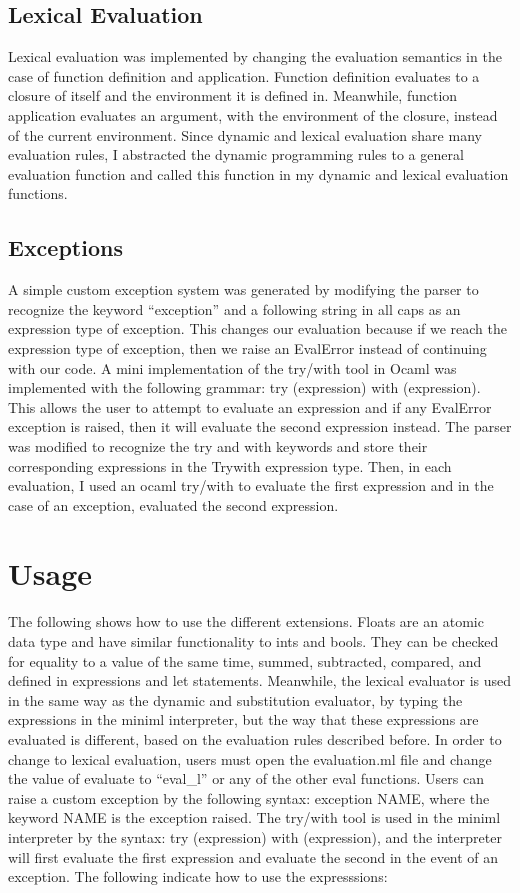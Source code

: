\documentclass{article}
\begin{document}
\subsection{Lexical Evaluation}
Lexical evaluation was implemented by changing the evaluation semantics in the case of function definition and application. Function definition evaluates to a closure of itself and the environment it is defined in. Meanwhile, function application evaluates an argument, with the environment of the closure, instead of the current environment. Since dynamic and lexical evaluation share many evaluation rules, I abstracted the dynamic programming rules to a general evaluation function and called this function in my dynamic and lexical evaluation functions. 
\\
\subsection{Exceptions}
A simple custom exception system was generated by modifying the parser to recognize the keyword “exception” and a following string in all caps as an expression type of exception. This changes our evaluation because if we reach the expression type of exception, then we raise an EvalError instead of continuing with our code. A mini implementation of the try/with tool in Ocaml was implemented with the following grammar: try (expression) with (expression). This allows the user to attempt to evaluate an expression and if any EvalError exception is raised, then it will evaluate the second expression instead. The parser was modified to recognize the try and with keywords and store their corresponding expressions in the Trywith expression type. Then, in each evaluation, I used an ocaml try/with to evaluate the first expression and in the case of an exception, evaluated the second expression. 

\section{Usage}
The following shows how to use the different extensions. Floats are an atomic data type and have similar functionality to ints and bools. They can be checked for equality to a value of the same time, summed, subtracted, compared, and defined in expressions and let statements. Meanwhile, the lexical evaluator is used in the same way as the dynamic and substitution evaluator, by typing the expressions in the miniml interpreter, but the way that these expressions are evaluated is different, based on the evaluation rules described before. In order to change to lexical evaluation, users must open the evaluation.ml file and change the value of evaluate to “eval\_l” or any of the other eval functions. Users can raise a custom exception by the following syntax: exception NAME, where the keyword NAME is the exception raised. The try/with tool is used in the miniml interpreter by the syntax: try (expression) with (expression), and the interpreter will first evaluate the first expression and evaluate the second in the event of an exception. The following indicate how to use the expresssions: 
\newline
\end{document}
